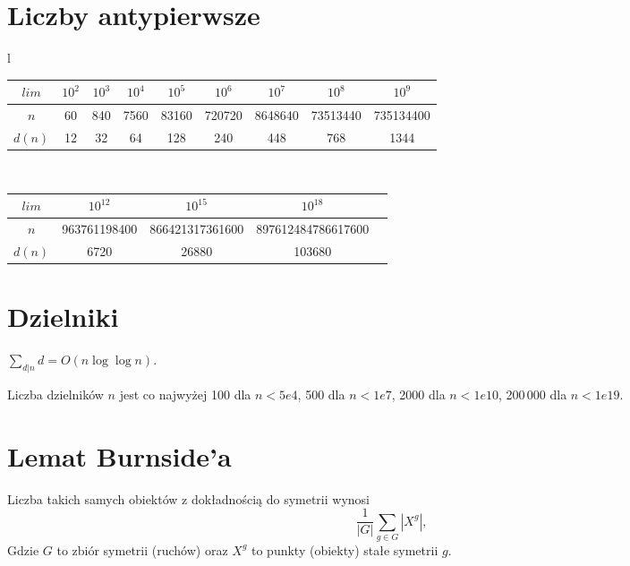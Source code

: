 \section{Liczby antypierwsze}
		\begin{center}
			\begin{tabular}{l}
				\begin{tabular}{c|c@{\ }c@{\ }c@{\ }c@{\ }c@{\ }c@{\ }c@{\ }c@{\ }}
					$lim$  & $10^2$ & $10^3$ & $10^4$ & $10^5$ & $10^6$ & $10^7$ & $10^8$ & $10^9$\\
					\hline
					$n$ & 60 & 840 & 7560 & 83160 & 720720 & 8648640 & 73513440 & 735134400\\
					\hline
					$d(n)$ & 12 & 32 & 64 & 128 & 240 & 448 & 768 & 1344\\
				\end{tabular}\\
				\begin{tabular}{c|c@{\ }c@{\ }c@{\ }c}
					$lim$  & $10^{12}$  & $10^{15}$   & $10^{18}$\\
					\hline
					$n$ & 963761198400 & 866421317361600 & 897612484786617600\\
					\hline
					$d(n)$ & 6720 & 26880 & 103680\\
				\end{tabular}
			\end{tabular}
		\end{center}

\section{Dzielniki}
	$\sum_{d|n} d = O(n \log \log n)$.

	Liczba dzielników $n$ jest co najwyżej 100 dla $n < 5e4$, 500 dla $n < 1e7$, 2000 dla $n < 1e10$, 200\,000 dla $n < 1e19$.


\section{Lemat Burnside'a}
	Liczba takich samych obiektów z dokładnością do symetrii wynosi
	 \[ {\frac {1}{|G|}}\sum _{{g\in G}}|X^{g}|, \]
	Gdzie $G$ to zbiór symetrii (ruchów) oraz $X^g$ to punkty (obiekty) stałe symetrii $g$.

